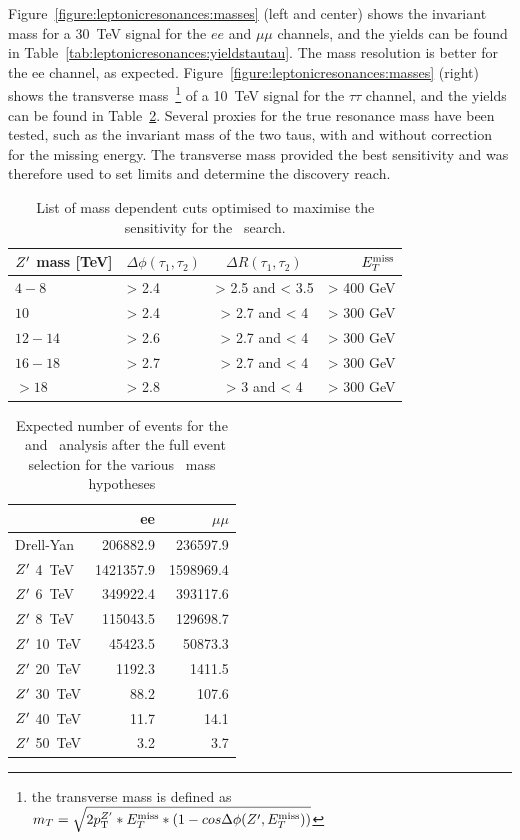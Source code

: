 Figure~\ref{figure:leptonicresonances:masses} (left and center) shows the invariant mass for a 30~TeV signal for the $ee$ and $\mu\mu$ channels, and the yields can be found in Table~\ref{tab:leptonicresonances:yieldstautau}. The mass resolution is better for the ee channel, as expected. Figure~\ref{figure:leptonicresonances:masses} (right) shows the transverse mass~\footnote{the transverse mass is defined as $m_{T}  =  \sqrt{2p_{\text{T}}^{Z^{\prime}}*E_{T}^{\rm{miss}}*(1-cos\Delta\phi(Z^{\prime},E_{T}^{\rm{miss}}))} $}
of a 10~TeV signal for the $\tau\tau$ channel, and the yields can be found in Table~\ref{tab:leptonicresonances:yieldsll}.
Several proxies for the true resonance mass have been tested, such as the invariant mass of the two taus, with and without correction for the missing energy. The transverse mass provided the best sensitivity and was therefore used to set limits and determine the discovery reach.

\begin{table}[htbp]
   \centering
\begin{tabular}{|l|l|c|r|}
  \hline
  \hline
   $Z^{\prime}$ mass [TeV] &  $\Delta \phi(\tau_1, \tau_2)$&  $\Delta R(\tau_1, \tau_2)$ & $E_{T}^{\rm{miss}}$\\
  \hline
  $4-8$ & > 2.4 & > 2.5 and < 3.5 & > 400 GeV\\
  $10$ & > 2.4 & > 2.7 and < 4 & > 300 GeV\\
  $12-14$ & > 2.6 & > 2.7 and < 4 & > 300 GeV\\
  $16-18$ & > 2.7 & > 2.7 and < 4 & > 300 GeV\\
  $>18$ & > 2.8 & > 3 and < 4 & > 300 GeV\\
  \hline
  \hline
  \end{tabular}
  \caption{List of mass dependent cuts optimised to maximise the sensitivity for the \Zptata\ search.}
  \label{tab:leptonicresonances:selectiontautau}
\end{table}

\begin{table}[htbp]
   \centering
\begin{tabular}{|l|r|r|}
  \hline
  \hline
 & ee & $\mu\mu$  \\
  \hline
  Drell-Yan & 206882.9 & 236597.9 \\
  \hline
  $Z^{\prime}$ 4~TeV & 1421357.9    & 1598969.4 \\
  $Z^{\prime}$ 6~TeV & 349922.4  & 393117.6\\
  $Z^{\prime}$ 8~TeV &   115043.5 & 129698.7 \\
  $Z^{\prime}$ 10~TeV &  45423.5 & 50873.3 \\
  $Z^{\prime}$ 20~TeV &  1192.3 & 1411.5\\
  $Z^{\prime}$ 30~TeV &  88.2 & 107.6\\
  $Z^{\prime}$ 40~TeV &  11.7 & 14.1 \\
  $Z^{\prime}$ 50~TeV &  3.2 & 3.7\\
  \hline
  \hline
\end{tabular}
  \caption{Expected number of events for the \Zpee\ and \Zpmumu\ analysis after the full event selection for the various \Zp\ mass hypotheses}
  \label{tab:leptonicresonances:yieldsll}
\end{table}

